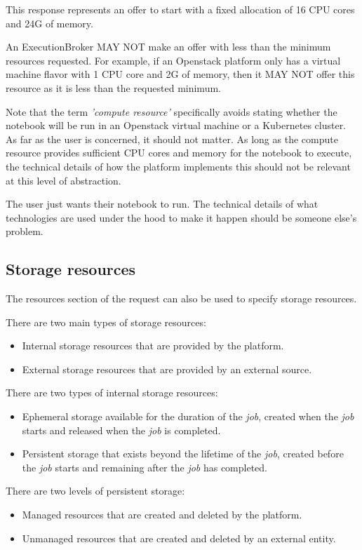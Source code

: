 \documentclass[11pt,a4paper]{ivoa}
\newcommand{\execbrokerclass} {ExecutionBroker}
\newcommand{\openstack} {Openstack}
\newcommand{\kubernetes} {Kubernetes}
\newcommand{\cpu}[1] {CPU#1}
\newcommand{\job} {\textit{job}}
\begin{document}
This response represents an offer to start with a fixed allocation of 16 \cpu{} cores and 24G of memory.

An \execbrokerclass{} MAY NOT make an offer with less than the minimum resources requested.
For example, if an \openstack{} platform only has a virtual machine flavor with 1 \cpu{} core and 2G of memory,
then it MAY NOT offer this resource as it is less than the requested minimum.

Note that the term \textit{'compute resource'} specifically avoids stating whether the
notebook will be run in an \openstack{} virtual machine or a \kubernetes{} cluster.
As far as the user is concerned, it should not matter. As long as the compute resource provides
sufficient \cpu{} cores and memory for the notebook to execute, the technical details of how the
platform implements this should not be relevant at this level of abstraction.

The user just wants their notebook to run. The technical details of what technologies are used
under the hood to make it happen should be someone else's problem.

\subsection{Storage resources}
\label{storage-resources}

The resources section of the request can also be used to specify storage resources.

There are two main types of storage resources:
\begin{itemize}
    \item Internal storage resources that are provided by the platform.
    \item External storage resources that are provided by an external source.
\end{itemize}

There are two types of internal storage resources:
\begin{itemize}
    \item Ephemeral storage available for the duration of the \job{}, created when the \job{} starts and released when the \job{} is completed.
    \item Persistent storage that exists beyond the lifetime of the \job{}, created before the \job{} starts and remaining after the \job{} has completed.
\end{itemize}

There are two levels of persistent storage:
\begin{itemize}
    \item Managed resources that are created and deleted by the platform.
    \item Unmanaged resources that are created and deleted by an external entity.
\end{itemize}
\end{document}
